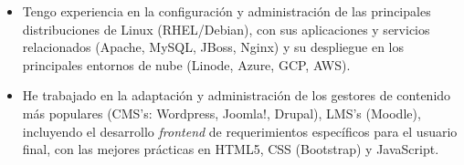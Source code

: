 \documentclass[overlapped,line,final]{../../templates/MichaelDeCorteCV/lib/res}
\begin{document}
\begin{resume}
\vspace{2mm}
\begin{itemize} 
	\item Tengo experiencia en la configuración y administración de las principales distribuciones de Linux (RHEL/Debian), con sus aplicaciones y servicios relacionados (Apache, MySQL, JBoss, Nginx) y su despliegue en los principales entornos de nube (Linode, Azure, GCP, AWS).
	\item He trabajado en la adaptación y administración de los gestores de contenido más populares (CMS's: Wordpress, Joomla!, Drupal), LMS's (Moodle), incluyendo el desarrollo \textit{frontend} de requerimientos específicos para el usuario final, con las mejores prácticas en HTML5, CSS (Bootstrap) y JavaScript.
\end{itemize}
    

\vspace{0.5cm}

\end{resume}
\end{document}
